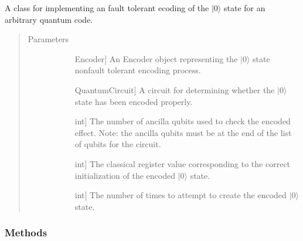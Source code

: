 \documentclass[letterpaper,10pt,english]{sphinxmanual}
\begin{document}
\begin{fulllineitems}
\label{\detokenize{Base:BaseFaultTolerance.FaultTolerantEncoder}}
A class for implementing an fault tolerant ecoding of the \(|0\rangle\) state for an arbitrary quantum code.
\begin{quote}\begin{description}
\item[{Parameters}] \leavevmode\begin{description}
\item[{}] \leavevmode{[}Encoder{]}
An Encoder object representing the \(|0\rangle\) state non\sphinxhyphen{}fault tolerant encoding process.

\item[{}] \leavevmode{[}QuantumCircuit{]}
A circuit for determining whether the \(|0\rangle\) state has been encoded properly.

\item[{}] \leavevmode{[}int{]}
The number of ancilla qubits used to check the encoded effect. 
Note: the ancilla qubits must be at the end of the list of qubits for the circuit.

\item[{}] \leavevmode{[}int{]}
The classical register value corresponding to the correct initialization of the encoded \(|0\rangle\) state.

\item[{}] \leavevmode{[}int{]}
The number of times to attempt to create the encoded \(|0\rangle\) state.

\end{description}

\end{description}\end{quote}
\subsubsection*{Methods}


\begin{savenotes}\sphinxattablestart
\centering
\begin{tabulary}{\linewidth}[t]{|T|T|}
\hline


\end{tabulary}
\end{savenotes}
\end{fulllineitems}
\end{document}
